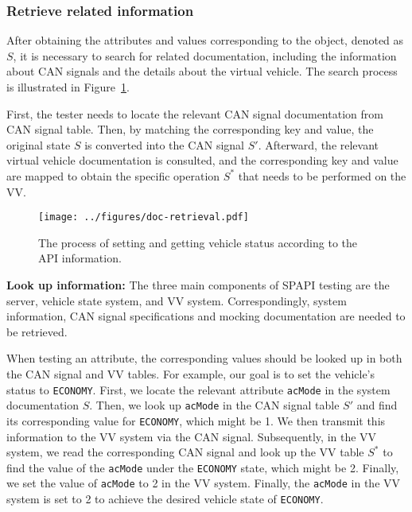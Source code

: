 \subsubsection{Retrieve related information}
After obtaining the attributes and values corresponding to the object, denoted as $S$, it is necessary to search for related documentation, including the information about CAN signals and the details about the virtual vehicle. The search process is illustrated in Figure~\ref{fig:mapping}.

First, the tester needs to locate the relevant CAN signal documentation from CAN signal table. Then, by matching the corresponding key and value, the original state $S$ is converted into the CAN signal $S'$. Afterward, the relevant virtual vehicle documentation is consulted, and the corresponding key and value are mapped to obtain the specific operation $S^*$ that needs to be performed on the VV.


\begin{figure}[t]
  \centering
  \texttt{[image: ../figures/doc-retrieval.pdf]}
  \caption{The process of setting and getting vehicle status according to the API information.}
  \vspace{-0.4cm}
  \label{fig:mapping}
\end{figure}

\textbf{Look up information:}
The three main components of SPAPI testing are the server, vehicle state system, and VV system. Correspondingly, system information, CAN signal specifications and mocking documentation are needed to be retrieved. 

When testing an attribute, the corresponding values should be looked up in both the CAN signal and VV tables. For example, our goal is to set the vehicle's status to \texttt{ECONOMY}.
First, we locate the relevant attribute \texttt{acMode} in the system documentation \( S \). 
Then, we look up \texttt{acMode} in the CAN signal table \( S' \) and find its corresponding value for \texttt{ECONOMY}, which might be 1. 
We then transmit this information to the VV system via the CAN signal. 
Subsequently, in the VV system, we read the corresponding CAN signal and look up the VV table $S^*$ to find the value of the \texttt{acMode} under the \texttt{ECONOMY} state, which might be 2. Finally, we set the value of \texttt{acMode} to 2 in the VV system.
Finally, the \texttt{acMode} in the VV system is set to 2 to achieve the desired vehicle state of \texttt{ECONOMY}.


